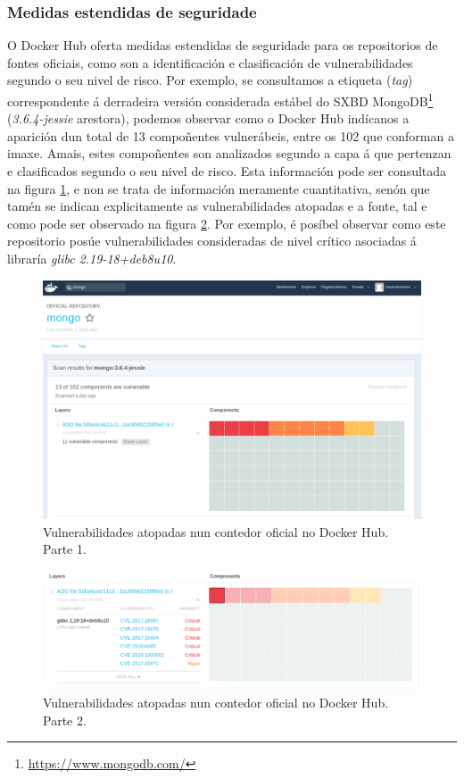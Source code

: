 \subsubsection{Medidas estendidas de seguridade}

O Docker Hub oferta medidas estendidas de seguridade para os repositorios de fontes oficiais, como son a identificación e clasificación de vulnerabilidades segundo o seu nivel de risco. Por exemplo, se consultamos a etiqueta (\textit{tag}) correspondente á derradeira versión considerada estábel do \gls{SXBD} MongoDB\footnote{\url{https://www.mongodb.com/}} (\textit{3.6.4-jessie} arestora), podemos observar como o Docker Hub indícanos a aparición dun total de 13 compoñentes vulnerábeis, entre os 102 que conforman a imaxe. Amais, estes compoñentes son analizados segundo a capa á que pertenzan e clasificados segundo o seu nivel de risco. Esta información pode ser consultada na figura \ref{mongoOficialVulnerabilidades}, e non se trata de información meramente cuantitativa, senón que tamén se indican explicitamente as vulnerabilidades atopadas e a fonte, tal e como pode ser observado na figura \ref{mongoOficialVulnerabilidades2}. Por exemplo, é posíbel observar como este repositorio posúe vulnerabilidades consideradas de nivel crítico asociadas á libraría {\it glibc 2.19-18+deb8u10}.\\

\begin{figure}
\centerline{\includegraphics[width=15cm]{figuras/mongoOficialVulnerabilidades.png}}
\caption{Vulnerabilidades atopadas nun contedor oficial no Docker Hub. Parte 1.}
\label{mongoOficialVulnerabilidades}
\end{figure}

\begin{figure}
\centerline{\includegraphics[width=15cm]{figuras/mongoOficialVulnerabilidades2.png}}
\caption{Vulnerabilidades atopadas nun contedor oficial no Docker Hub. Parte 2.}
\label{mongoOficialVulnerabilidades2}
\end{figure}

